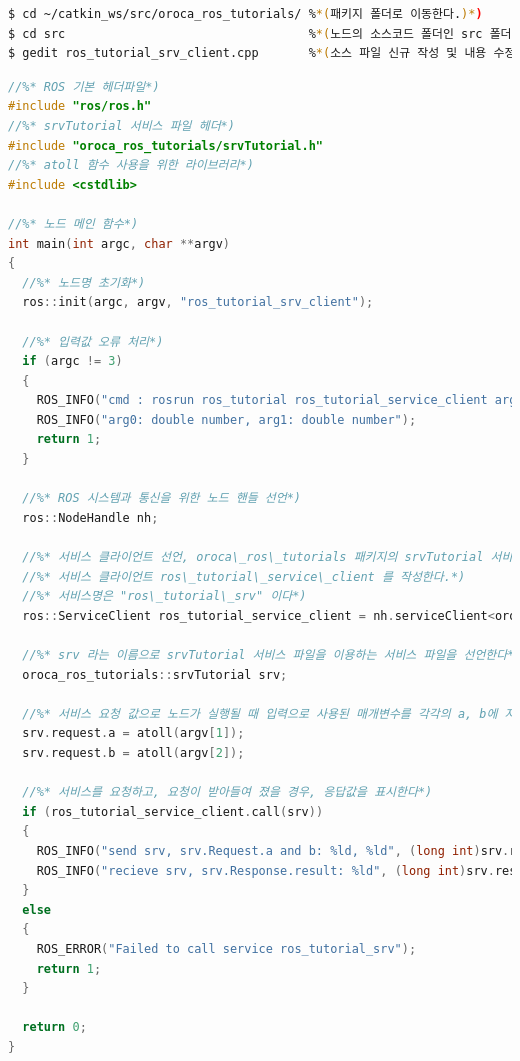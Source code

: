 \begin{lstlisting}[language=bash]
$ cd ~/catkin_ws/src/oroca_ros_tutorials/ %*(패키지 폴더로 이동한다.)*)
$ cd src                                  %*(노드의 소스코드 폴더인 src 폴더로 이동)*)
$ gedit ros_tutorial_srv_client.cpp       %*(소스 파일 신규 작성 및 내용 수정)*)
\end{lstlisting}

\begin{lstlisting}[language=C++]
//%* ROS 기본 헤더파일*)
#include "ros/ros.h"
//%* srvTutorial 서비스 파일 헤더*)
#include "oroca_ros_tutorials/srvTutorial.h"
//%* atoll 함수 사용을 위한 라이브러리*)
#include <cstdlib>

//%* 노드 메인 함수*)
int main(int argc, char **argv)
{
  //%* 노드명 초기화*)
  ros::init(argc, argv, "ros_tutorial_srv_client");

  //%* 입력값 오류 처리*)
  if (argc != 3)                                    
  {
    ROS_INFO("cmd : rosrun ros_tutorial ros_tutorial_service_client arg0 arg1");
    ROS_INFO("arg0: double number, arg1: double number");
    return 1;
  }

  //%* ROS 시스템과 통신을 위한 노드 핸들 선언*)
  ros::NodeHandle nh;

  //%* 서비스 클라이언트 선언, oroca\_ros\_tutorials 패키지의 srvTutorial 서비스 파일을 이용한*)
  //%* 서비스 클라이언트 ros\_tutorial\_service\_client 를 작성한다.*)
  //%* 서비스명은 "ros\_tutorial\_srv" 이다*)
  ros::ServiceClient ros_tutorial_service_client = nh.serviceClient<oroca_ros_tutorials::srvTutorial>("ros_tutorial_srv");

  //%* srv 라는 이름으로 srvTutorial 서비스 파일을 이용하는 서비스 파일을 선언한다*)
  oroca_ros_tutorials::srvTutorial srv;

  //%* 서비스 요청 값으로 노드가 실행될 때 입력으로 사용된 매개변수를 각각의 a, b에 저장한다*)
  srv.request.a = atoll(argv[1]);
  srv.request.b = atoll(argv[2]);

  //%* 서비스를 요청하고, 요청이 받아들여 졌을 경우, 응답값을 표시한다*)
  if (ros_tutorial_service_client.call(srv))
  {
    ROS_INFO("send srv, srv.Request.a and b: %ld, %ld", (long int)srv.request.a, (long int)srv.request.b);
    ROS_INFO("recieve srv, srv.Response.result: %ld", (long int)srv.response.result);
  }
  else
  {
    ROS_ERROR("Failed to call service ros_tutorial_srv");
    return 1;
  }

  return 0;
}
\end{lstlisting}

